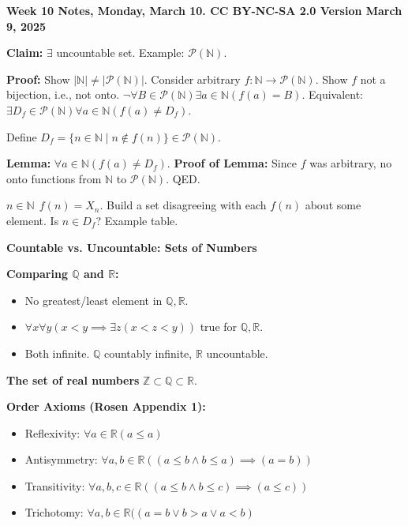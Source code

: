 \documentclass[10pt]{article}
\begin{document}
\tiny
\begin{multicols}{3}

\textbf{Week 10 Notes, Monday, March 10. CC BY-NC-SA 2.0 Version March 9, 2025}

\textbf{Claim:} $\exists$ uncountable set. Example: $\mathcal{P}(\mathbb{N})$.

\textbf{Proof:} Show $|\mathbb{N}| \neq |\mathcal{P}(\mathbb{N})|$. Consider arbitrary $f: \mathbb{N} \to \mathcal{P}(\mathbb{N})$.  Show $f$ not a bijection, i.e., not onto.
$\neg \forall B \in \mathcal{P}(\mathbb{N}) \exists a \in \mathbb{N} (f(a)=B)$.  Equivalent: $\exists D_f \in \mathcal{P}(\mathbb{N}) \forall a \in \mathbb{N} (f(a) \neq D_f)$.

Define $D_f = \{n \in \mathbb{N} \mid n \notin f(n) \} \in \mathcal{P}(\mathbb{N})$.

\textbf{Lemma:} $\forall a \in \mathbb{N} (f(a) \neq D_f)$.
\newline
\textbf{Proof of Lemma:}  Since $f$ was arbitrary, no onto functions from $\mathbb{N}$ to $\mathcal{P}(\mathbb{N})$. QED.

\noindent $n \in \mathbb{N} \ \ f(n)=X_n$. Build a set disagreeing with each $f(n)$ about some element. Is $n \in D_f$?
Example table.

\hrulefill

\textbf{Countable vs. Uncountable: Sets of Numbers}

\textbf{Comparing $\mathbb{Q}$ and $\mathbb{R}$:}
\begin{itemize}
    \item No greatest/least element in $\mathbb{Q}, \mathbb{R}$.
    \item $\forall x \forall y (x<y \implies \exists z (x<z<y))$ true for $\mathbb{Q}, \mathbb{R}$.
    \item Both infinite. $\mathbb{Q}$ countably infinite, $\mathbb{R}$ uncountable.
\end{itemize}

\textbf{The set of real numbers} $\mathbb{Z} \subset \mathbb{Q} \subset \mathbb{R}$.

\textbf{Order Axioms (Rosen Appendix 1):}
\begin{itemize}
    \item Reflexivity: $\forall a \in \mathbb{R} (a \leq a)$
    \item Antisymmetry: $\forall a, b \in \mathbb{R} ((a \leq b \land b \leq a) \implies (a=b))$
    \item Transitivity: $\forall a, b, c \in \mathbb{R} ((a \leq b \land b \leq c) \implies (a \leq c))$
    \item Trichotomy: $\forall a, b \in \mathbb{R} ((a=b \lor b>a \lor a<b)$
\end{itemize}


\end{multicols}
\end{document}
